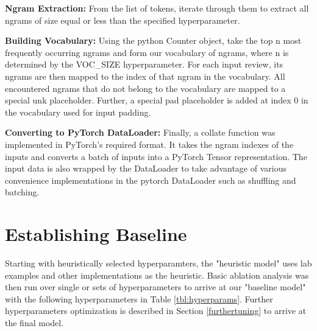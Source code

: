 \documentclass[a4paper,10pt]{article}
\begin{document}
\par
\justify
\textbf{Ngram Extraction:} From the list of tokens, iterate through them to extract all ngrams of size equal or less than the specified hyperparameter. 

\par
\justify
\textbf{Building Vocabulary:} Using the python Counter object, take the top n most frequently occurring ngrams and form our vocabulary of ngrams, where n is determined by the VOC\_SIZE hyperparameter. For each input review, its ngrams are then mapped to the index of that ngram in the vocabulary. All encountered ngrams that do not belong to the vocabulary are mapped to a special \textlangle{}unk\textrangle{} placeholder. Further, a special \textlangle{}pad\textrangle{} placeholder is added at index 0 in the vocabulary used for input padding.

\par
\justify
\textbf{Converting to PyTorch DataLoader:} Finally, a collate function was implemented in PyTorch's required format. It takes the ngram indexes of the inputs and converts a batch of inputs into a PyTorch Tensor representation. The input data is also wrapped by the DataLoader to take advantage of various convenience implementations in the pytorch DataLoader such as shuffling and batching.

\section{Establishing Baseline}
Starting with heuristically selected hyperparamters, the "heuristic model" uses lab examples and other implementations as the heuristic. Basic ablation analysis was then run over single or sets of hyperparameters to arrive at our "baseline model" with the following hyperparameters in Table \ref{tbl:hyperparams}.  Further hyperparameters optimization is described in Section \ref{furthertuning} to arrive at the final model.
\end{document}
